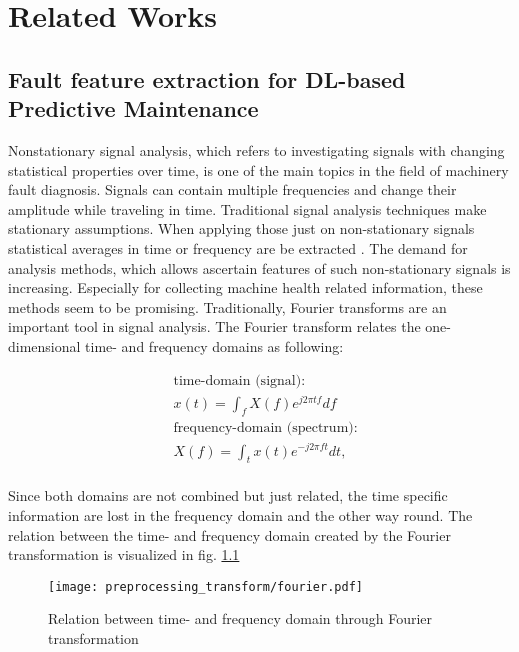 
\chapter{Related Works}\label{chapter:related_works}

\section{Fault feature extraction for DL-based Predictive Maintenance}
Nonstationary signal analysis, which refers to investigating signals with changing statistical properties over time, is one of the main topics in the field of machinery fault diagnosis. Signals can contain multiple frequencies and change their amplitude while traveling in time. Traditional signal analysis techniques make stationary assumptions. When applying those just on non-stationary signals statistical averages in time or frequency are be extracted \cite{FENG2013}. The demand for analysis methods, which allows ascertain features of such non-stationary signals is increasing. Especially for collecting machine health related information, these methods seem to be promising. Traditionally, Fourier transforms are an important tool in signal analysis. The Fourier transform relates the one-dimensional time- and frequency domains as following:

\begin{equation}
    \begin{aligned}
        & \mbox{time-domain (signal):} \\
        & x(t) = \int_{f} X(f) e^{j 2 \pi t f} df \\
        & \mbox{frequency-domain (spectrum):} \\
        & X(f) = \int_{t} x(t) e^{- j 2 \pi f t} dt, \\
    \end{aligned}
\end{equation}

Since both domains are not combined but just related, the time specific information are lost in the frequency domain and the other way round. The relation between the time- and frequency domain created by the Fourier transformation is visualized in fig. \ref{fig:fourier} 
\begin{figure}[p]
  \centering
  \texttt{[image: preprocessing\_transform/fourier.pdf]}
  \caption{Relation between time- and frequency domain through Fourier transformation}
  \label{fig:fourier}
\end{figure}

